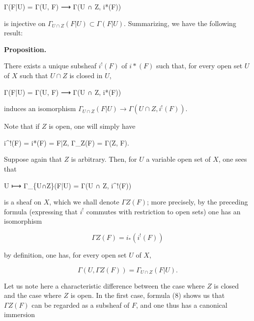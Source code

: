 \documentclass[
  11pt,
  a4paper,
]{book}
\newenvironment{Shaded}{}{}
\newcommand{\NormalTok}[1]{#1}
\begin{document}
\begin{Shaded}
\begin{Highlighting}[]
\NormalTok{Γ(F|U) = Γ(U, F) ⟶ Γ(U ∩ Z, i*(F))}
\end{Highlighting}
\end{Shaded}

is injective on \(\Gamma_{U\cap Z}(F|U) \subset \Gamma(F|U)\).
Summarizing, we have the following result:

\textbf{Proposition.}

There exists a unique subsheaf \(i^{!}(F)\) of \(i*(F)\) such that, for
every open set \(U\) of \(X\) such that \(U \cap Z\) is closed in \(U\),

\begin{Shaded}
\begin{Highlighting}[]
\NormalTok{Γ(F|U) = Γ(U, F) ⟶ Γ(U ∩ Z, i*(F))}
\end{Highlighting}
\end{Shaded}

induces an isomorphism
\(\Gamma_{U\cap Z}(F|U) \to \Gamma(U \cap Z, i^{!}(F))\).

Note that if \(Z\) is open, one will simply have

\begin{Shaded}
\begin{Highlighting}[]
\NormalTok{i\^{}!(F) = i*(F) = F|Z, Γ\_Z(F) = Γ(Z, F).}
\end{Highlighting}
\end{Shaded}

Suppose again that \(Z\) is arbitrary. Then, for \(U\) a variable open
set of \(X\), one sees that

\begin{Shaded}
\begin{Highlighting}[]
\NormalTok{U ⟼ Γ\_\{U∩Z\}(F|U) = Γ(U ∩ Z, i\^{}!(F))}
\end{Highlighting}
\end{Shaded}

is a sheaf on \(X\), which we shall denote \(\Gamma Z(F)\); more
precisely, by the preceding formula (expressing that \(i^{!}\) commutes
with restriction to open sets) one has an isomorphism

\[ \Gamma Z(F) = i_{*}(i^{!}(F)) \]

by definition, one has, for every open set \(U\) of \(X\),

\[ \Gamma(U, \Gamma Z(F)) = \Gamma_{U\cap Z}(F|U). \]

Let us note here a characteristic difference between the case where
\(Z\) is closed and the case where \(Z\) is open. In the first case,
formula (8) shows us that \(\Gamma Z(F)\) can be regarded as a subsheaf
of \(F\), and one thus has a canonical immersion
\end{document}
